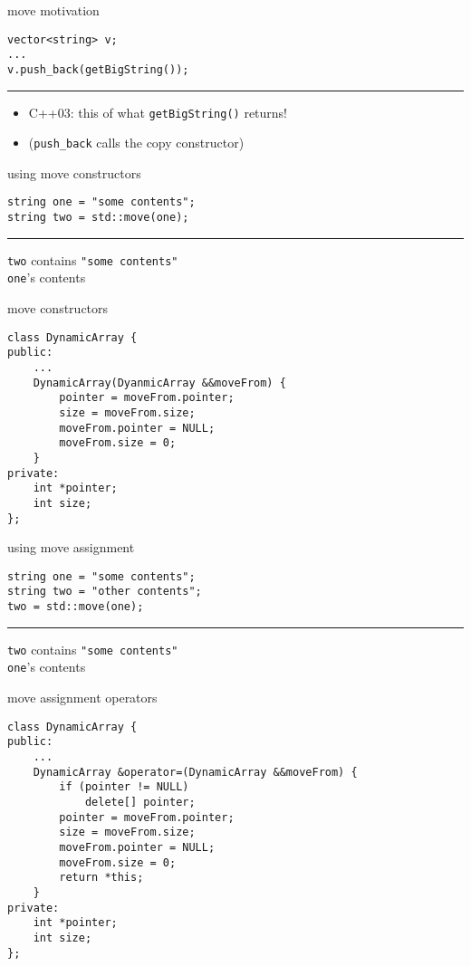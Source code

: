 \begin{frame}[fragile,label=motivateMove]{move motivation}
\lstset{language=C++,style=small}
\begin{lstlisting}
vector<string> v;
...
v.push_back(getBigString());
\end{lstlisting}
\hrule
\begin{itemize}
\item C++03: this  of what \texttt{getBigString()} returns!
\item (\texttt{push\_back} calls the copy constructor)
\end{itemize}
\end{frame}

\begin{frame}[fragile,label=usingMoveC]{using move constructors}
\lstset{language=C++,style=small}
\begin{lstlisting}
string one = "some contents";
string two = std::move(one);
\end{lstlisting}
\hrule
\texttt{two} contains \texttt{"some contents"} \\
\texttt{one}'s contents 
\end{frame}

\begin{frame}[fragile,label=moveConstruct]{move constructors}
\lstset{language=C++,style=smaller}
\begin{lstlisting}
class DynamicArray {
public:
    ...
    DynamicArray(DyanmicArray &&moveFrom) {
        pointer = moveFrom.pointer;
        size = moveFrom.size;
        moveFrom.pointer = NULL;
        moveFrom.size = 0;
    }
private:
    int *pointer;
    int size;
};
\end{lstlisting}
\end{frame}

\begin{frame}[fragile,label=usingMoveA]{using move assignment}
\lstset{language=C++,style=small}
\begin{lstlisting}
string one = "some contents";
string two = "other contents";
two = std::move(one);
\end{lstlisting}
\hrule
\texttt{two} contains \texttt{"some contents"} \\
\texttt{one}'s contents 
\end{frame}

\begin{frame}[fragile,label=moveA]{move assignment operators}
\lstset{language=C++,style=smaller}
\begin{lstlisting}
class DynamicArray {
public:
    ...
    DynamicArray &operator=(DynamicArray &&moveFrom) {
        if (pointer != NULL)
            delete[] pointer;
        pointer = moveFrom.pointer;
        size = moveFrom.size;
        moveFrom.pointer = NULL;
        moveFrom.size = 0;
        return *this;
    }
private:
    int *pointer;
    int size;
};
\end{lstlisting}
\end{frame}
